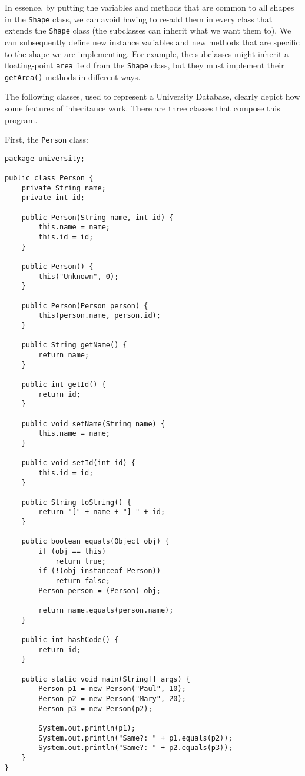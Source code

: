 In essence, by putting the variables and methods that are common to all shapes in the \verb!Shape! class, we can avoid having to re-add them in every class that extends the \verb!Shape! class (the subclasses can inherit what we want them to). We can subsequently define new instance variables and new methods that are specific to the shape we are implementing. For example, the subclasses might inherit a floating-point \verb!area! field from the \verb!Shape! class, but they must implement their \verb!getArea()! methods in different ways.



The following classes, used to represent a University Database, clearly depict how some features of inheritance work. There are three classes that compose this program. 

First, the \verb!Person! class:

\begin{lstlisting}
package university;

public class Person {
	private String name;
	private int id;

	public Person(String name, int id) {
		this.name = name;
		this.id = id;
	}

	public Person() {
		this("Unknown", 0);
	}

	public Person(Person person) {
		this(person.name, person.id);
	}

	public String getName() {
		return name;
	}

	public int getId() {
		return id;
	}

	public void setName(String name) {
		this.name = name;
	}

	public void setId(int id) {
		this.id = id;
	}

	public String toString() {
		return "[" + name + "] " + id;
	}

	public boolean equals(Object obj) {
		if (obj == this)
			return true;
		if (!(obj instanceof Person))
			return false;
		Person person = (Person) obj;

		return name.equals(person.name);
	}

	public int hashCode() {
		return id;
	}

	public static void main(String[] args) {
		Person p1 = new Person("Paul", 10);
		Person p2 = new Person("Mary", 20);
		Person p3 = new Person(p2);

		System.out.println(p1);
		System.out.println("Same?: " + p1.equals(p2));
		System.out.println("Same?: " + p2.equals(p3));
	}
}
\end{lstlisting}


